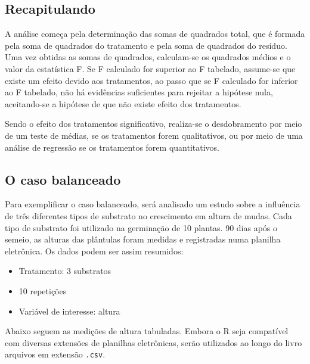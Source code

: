 \documentclass[
]{article}
\providecommand{\tightlist}{%
  \setlength{\itemsep}{0pt}\setlength{\parskip}{0pt}}
\begin{document}
\hypertarget{recapitulando}{%
\subsection{Recapitulando}\label{recapitulando}}

A análise começa pela determinação das somas de quadrados total, que é formada pela soma de quadrados do tratamento e pela soma de quadrados do resíduo. Uma vez obtidas as somas de quadrados, calculam-se os quadrados médios e o valor da estatística F. Se F calculado for superior ao F tabelado, assume-se que existe um efeito devido aos tratamentos, ao passo que se F calculado for inferior ao F tabelado, não há evidências suficientes para rejeitar a hipótese nula, aceitando-se a hipótese de que não existe efeito dos tratamentos.

Sendo o efeito dos tratamentos significativo, realiza-se o desdobramento por meio de um teste de médias, se os tratamentos forem qualitativos, ou por meio de uma análise de regressão se os tratamentos forem quantitativos.

\hypertarget{o-caso-balanceado}{%
\subsection{O caso balanceado}\label{o-caso-balanceado}}

Para exemplificar o caso balanceado, será analisado um estudo sobre a influência de três diferentes tipos de substrato no crescimento em altura de mudas. Cada tipo de substrato foi utilizado na germinação de 10 plantas. 90 dias após o semeio, as alturas das plântulas foram medidas e registradas numa planilha eletrônica. Os dados podem ser assim resumidos:

\begin{itemize}
\tightlist
\item
  Tratamento: 3 substratos
\item
  10 repetições
\item
  Variável de interesse: altura
\end{itemize}

Abaixo seguem as medições de altura tabuladas. Embora o R seja compatível com diversas extensões de planilhas eletrônicas, serão utilizados ao longo do livro arquivos em extensão \texttt{.csv}.
\end{document}
